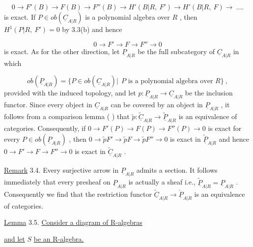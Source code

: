 \begin{equation*}
0 \to F'(B) \to F(B) \to F''(B) \to H'(B|R,\ F') \to H'(B|R,\ F) \to \ ....
\end{equation*}
is exact. If  $P \in ob(\underline{C}_{A|R})$  is a polynomial algebra over  $R$ , then  $H^{1}(P|R,\ F') = 0$  by 3.3(b) and hence

\begin{equation*}
0 \to F' \to F \to F'' \to 0
\end{equation*}
is exact. As for the other direction, let  $\underline{P}_{A|R}$  be the full subcategory of  $\underline{C}_{A|R}$  in which

\begin{equation*}
ob(\underline{P}_{A|R}) = \{P \in ob(\underline{C}_{A|R})|\ \ P \text{ is a polynomial algebra over } R\} \ ,
\end{equation*}
provided with the induced topology, and let  $p : \underline{P}_{A|R} \to \underline{C}_{A|R}$  be the inclusion functor. Since every object in  $\underline{C}_{A|R}$  can be covered by an object in  $\underline{P}_{A|R}$ , it follows from a comparison lemma (          ) that  $\widetilde{p} : \widetilde{\underline{C}}_{A|R} \to \widetilde{\underline{P}}_{A|R}$  is an equivalence of categories. Consequently, if  $0 \to F'(P) \to F(P) \to F''(P) \to 0$  is exact for every  $P \in ob(\underline{P}_{A|R})$ , then  $0 \to \widetilde{p}F' \to \widetilde{p}F \to \widetilde{p}F'' \to 0$  is exact in  $\widetilde{\underline{P}}_{A|R}$  and hence  $0 \to F' \to F \to F'' \to 0$  is exact in  $\widetilde{\underline{C}}_{A|R}$  .



\underline{Remark} 3.4.  Every surjective arrow in  $\underline{P}_{A|R}$  admits a section. It follows immediately that every presheaf on  $\underline{P}_{A|R}$  is actually a sheaf i.e.,  $\widetilde{\underline{P}}_{A|R} = \underline{P}_{A|R}$ . Consequently we find that the restriction functor  $\widetilde{\underline{C}}_{A|R} \to \check{\underline{P}}_{A|R}$  is an equivalence of categories.

\underline{Lemma} 3.5.  \underline{Consider a diagram of R-algebras}

\begin{center}
\end{center}
\underline{and let}  $S$  \underline{be an R-algebra.}

